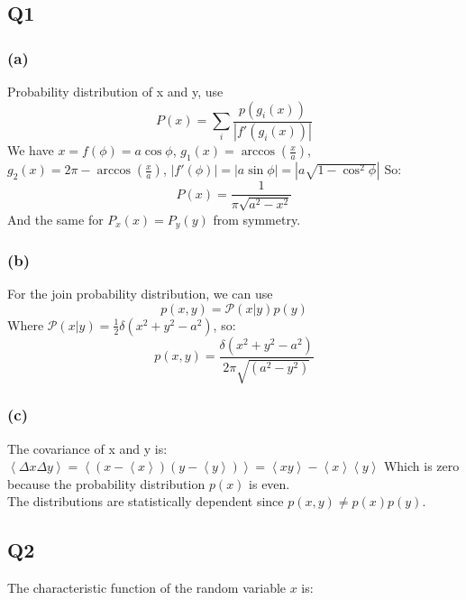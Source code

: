\documentclass[../main.tex]{subfiles}
\begin{document}
\subsection{Q1}
\subsubsection*{(a)}
Probability distribution of x and y, use 
\begin{equation}
	P(x) = \sum_i \frac{p(g_i(x))}{| f'(g_i(x)) |}
\end{equation}
We have $x=f(\phi) = a\cos\phi$, $g_1(x) = \arccos(\frac{x}{a})$, 
$g_2(x) =2\pi- \arccos(\frac{x}{a})$, $|f'(\phi)|=|a\sin\phi|= |a\sqrt{1-\cos^2\phi}|$ 
So:
\begin{equation}
	P(x) = \frac{1}{\pi\sqrt{a^2-x^2}}
\end{equation}
And the same for $P_x(x) = P_y(y)$ from symmetry.
\subsubsection*{(b)}
For the join probability distribution, we can use 
\begin{equation}
	p(x, y) = \mathcal{P}(x|y)p(y)
\end{equation}
Where $\mathcal{P}(x|y)=\frac{1}{2}\delta(x^2+y^2-a^2)$, so:
\begin{equation}
	p(x, y) = \frac{\delta(x^2+y^2-a^2)}{2\pi\sqrt{(a^2-y^2)}}
\end{equation}
\subsubsection*{(c)}
The covariance of x and y is: $\left<\Delta x \Delta y\right>=\left<(x-\left<x\right>)(y-\left<y\right>)\right>=\left<xy\right>-\left<x\right>\left<y\right>$ Which is zero because the probability distribution $p(x)$ is even.
\\
The distributions are statistically dependent since $p(x, y)\neq p(x)p(y)$.
\subsection{Q2}
The characteristic function of the random variable $x$ is:
\end{document}
